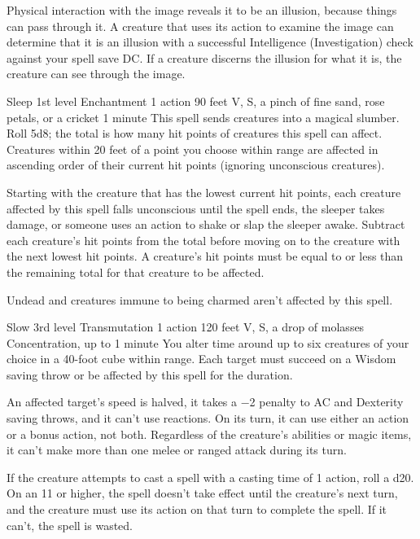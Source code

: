 \documentclass[10pt,a4paper,twoside,bg=print,twocolumn,openany,nodeprecatedcode]{dndbook}
\begin{document}
Physical interaction with the image reveals it to be an illusion, because things can pass through it. A creature that uses its action to examine the image can determine that it is an illusion with a successful Intelligence (Investigation) check against your spell save DC. If a creature discerns the illusion for what it is, the creature can see through the image.



\DndSpellHeader%
{Sleep}
{1st level Enchantment}
{1 action}
{90 feet}
{V, S, a pinch of fine sand, rose petals, or a cricket}
{1 minute}
This spell sends creatures into a magical slumber. Roll 5d8; the total is how many hit points of creatures this spell can affect. Creatures within 20 feet of a point you choose within range are affected in ascending order of their current hit points (ignoring unconscious creatures).

Starting with the creature that has the lowest current hit points, each creature affected by this spell falls unconscious until the spell ends, the sleeper takes damage, or someone uses an action to shake or slap the sleeper awake. Subtract each creature's hit points from the total before moving on to the creature with the next lowest hit points. A creature's hit points must be equal to or less than the remaining total for that creature to be affected.

Undead and creatures immune to being charmed aren't affected by this spell.



\DndSpellHeader%
{Slow}
{3rd level Transmutation}
{1 action}
{120 feet}
{V, S, a drop of molasses}
{Concentration, up to 1 minute}
You alter time around up to six creatures of your choice in a 40-foot cube within range. Each target must succeed on a Wisdom saving throw or be affected by this spell for the duration.

An affected target's speed is halved, it takes a −2 penalty to AC and Dexterity saving throws, and it can't use reactions. On its turn, it can use either an action or a bonus action, not both. Regardless of the creature's abilities or magic items, it can't make more than one melee or ranged attack during its turn.

If the creature attempts to cast a spell with a casting time of 1 action, roll a d20. On an 11 or higher, the spell doesn't take effect until the creature's next turn, and the creature must use its action on that turn to complete the spell. If it can't, the spell is wasted.
\end{document}
